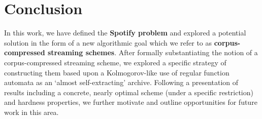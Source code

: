 \documentclass{article}
\theoremstyle{definition}
\begin{document}
\section{Conclusion}

In this work, we have defined the \textbf{Spotify problem} and explored a 
potential solution in the form of a new algorithmic goal which 
we refer to as \textbf{corpus-compressed streaming schemes}.  After formally substantiating 
the notion of a corpus-compressed streaming scheme, we explored a specific strategy of 
constructing them based upon a Kolmogorov-like use of regular function automata as an `almost self-extracting'
archive.  Following a presentation of results including a concrete, nearly optimal 
scheme (under a specific restriction) and hardness properties, we further motivate and outline 
opportunities for future work in this area.



\end{document}
